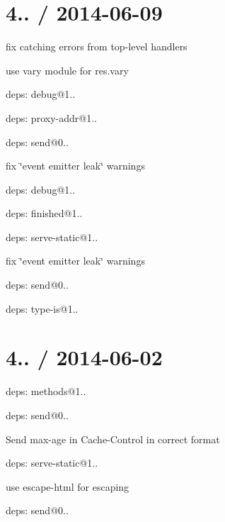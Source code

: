 \section*{4.. / 2014-\/06-\/09 }


\begin{DoxyItemize}
\item fix catching errors from top-\/level handlers
\item use {\ttfamily vary} module for {\ttfamily res.\+vary}
\item deps\+: debug@1..
\item deps\+: proxy-\/addr@1..
\item deps\+: send@0..
\begin{DoxyItemize}
\item fix \char`\"{}event emitter leak\char`\"{} warnings
\item deps\+: debug@1..
\item deps\+: finished@1..
\end{DoxyItemize}
\item deps\+: serve-\/static@1..
\begin{DoxyItemize}
\item fix \char`\"{}event emitter leak\char`\"{} warnings
\item deps\+: send@0..
\end{DoxyItemize}
\item deps\+: type-\/is@1..
\end{DoxyItemize}

\section*{4.. / 2014-\/06-\/02 }


\begin{DoxyItemize}
\item deps\+: methods@1..
\item deps\+: send@0..
\begin{DoxyItemize}
\item Send {\ttfamily max-\/age} in {\ttfamily Cache-\/\+Control} in correct format
\end{DoxyItemize}
\item deps\+: serve-\/static@1..
\begin{DoxyItemize}
\item use {\ttfamily escape-\/html} for escaping
\item deps\+: send@0..
\end{DoxyItemize}
\end{DoxyItemize}

